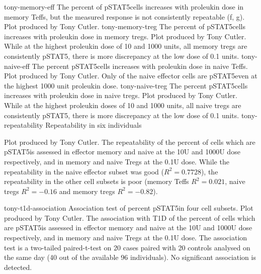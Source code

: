 {tony-memory-eff}
{ The percent of pSTAT5\positive cells increases with proleukin dose in memory Teffs,
but the measured response is not consistently repeatable (f, g). }
{
  Plot produced by Tony Cutler.
}
{tony-memory-treg}
{ The percent of pSTAT5\positive cells increases with proleukin dose in memory tregs. }
{
  Plot produced by Tony Cutler.
  While at the highest proleukin dose of 10 and 1000 units, all memory tregs are consistently pSTAT5\positive,
  there is more discrepancy at the low dose of 0.1 units.
}
{tony-naive-eff}
{ The percent pSTAT5\positive cells increases with proleukin dose in naive Teffs. }
{
  Plot produced by Tony Cutler.
  Only  of the naive effector cells are pSTAT5\positive even at the highest 1000 unit proleukin dose.
}
{tony-naive-treg}
{ The percent pSTAT5\positive cells increases with proleukin dose in naive tregs. }
{
  Plot produced by Tony Cutler.
  While at the highest proleukin doses of 10 and 1000 units, all naive tregs are consistently pSTAT5\positive,
  there is more discrepancy at the low dose of 0.1 units.
}
{tony-repeatability}
{ Repeatability in six individuals }
{
  Plot produced by Tony Cutler.
  The repeatability of the percent of cells which are pSTAT5\positive is assessed in effector memory and naive at the 10U and 1000U dose
  respectively, and in memory and naive Tregs at the 0.1U dose.
  While the repeatability in the naive effector subset was good ($R^2=0.7728$), the repeatability in the other cell subsets is poor
  (memory Teffs $R^2=0.021$, naive tregs $R^2=-0.16$ and memory tregs $R^2=-0.82$).

}
{tony-t1d-association}
{ Association test of percent pSTAT5\positive in four cell subsets. }
{
  Plot produced by Tony Cutler.
  The association with T1D of the percent of cells which are pSTAT5\positive is assessed in effector memory and naive at the 10U and 1000U dose
  respectively, and in memory and naive Tregs at the 0.1U dose.
  The association test is a two-tailed paired-t-test on 20 cases paired with 20 controls analysed on the same day (40 out of the available 96 individuals).
  No significant association is detected.
}


